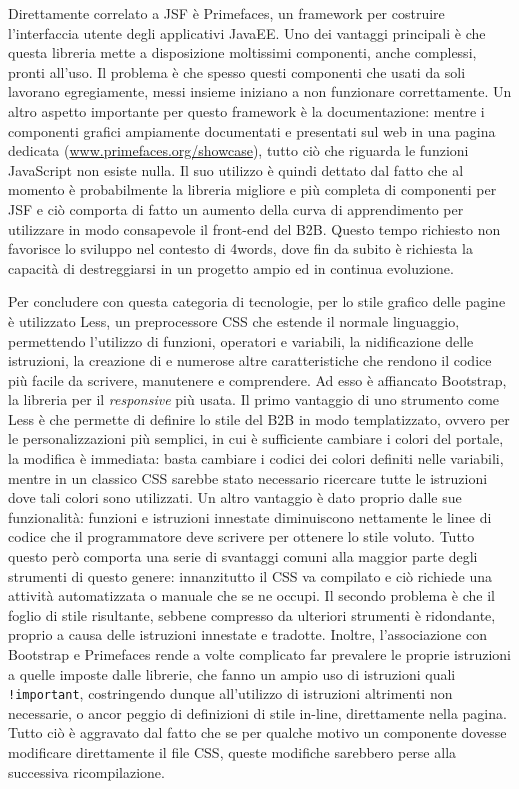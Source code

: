 Direttamente correlato a JSF è Primefaces, un framework per costruire l'interfaccia utente degli applicativi JavaEE. Uno dei vantaggi principali è che questa libreria mette a disposizione moltissimi componenti, anche complessi, pronti all'uso. Il problema è che spesso questi componenti che usati da soli lavorano egregiamente, messi insieme iniziano a non funzionare correttamente. Un altro aspetto importante per questo framework è la documentazione: mentre i componenti grafici ampiamente documentati e presentati sul web in una pagina dedicata (\url{www.primefaces.org/showcase}), tutto ciò che riguarda le funzioni JavaScript non esiste nulla. Il suo utilizzo è quindi dettato dal fatto che al momento è probabilmente la libreria migliore e più completa di componenti per JSF e ciò comporta di fatto un aumento della curva di apprendimento per utilizzare in modo consapevole il front-end del B2B. Questo tempo richiesto non favorisce lo sviluppo nel contesto di 4words, dove fin da subito è richiesta la capacità di destreggiarsi in un progetto ampio ed in continua evoluzione.

Per concludere con questa categoria di tecnologie, per lo stile grafico delle pagine è utilizzato Less, un preprocessore CSS che estende il normale linguaggio, permettendo l'utilizzo di funzioni, operatori e variabili, la nidificazione delle istruzioni, la creazione di  e numerose altre caratteristiche che rendono il codice più facile da scrivere, manutenere e comprendere.\autocite{wikipedia} Ad esso è affiancato Bootstrap, la libreria per il \textit{responsive} più usata. Il primo vantaggio di uno strumento come Less è che permette di definire lo stile del B2B in modo templatizzato, ovvero per le personalizzazioni più semplici, in cui è sufficiente cambiare i colori del portale, la modifica è immediata: basta cambiare i codici dei colori definiti nelle variabili, mentre in un classico CSS sarebbe stato necessario ricercare tutte le istruzioni dove tali colori sono utilizzati. Un altro vantaggio è dato proprio dalle sue funzionalità: funzioni e istruzioni innestate diminuiscono nettamente le linee di codice che il programmatore deve scrivere per ottenere lo stile voluto. Tutto questo però comporta una serie di svantaggi comuni alla maggior parte degli strumenti di questo genere: innanzitutto il CSS va compilato e ciò richiede una attività automatizzata o manuale che se ne occupi. Il secondo problema è che il foglio di stile risultante, sebbene compresso da ulteriori strumenti è ridondante, proprio a causa delle istruzioni innestate e tradotte. Inoltre, l'associazione con Bootstrap e Primefaces rende a volte complicato far prevalere le proprie istruzioni a quelle imposte dalle librerie, che fanno un ampio uso di istruzioni quali \texttt{!important}, costringendo dunque all'utilizzo di istruzioni altrimenti non necessarie, o ancor peggio di definizioni di stile in-line, direttamente nella pagina. Tutto ciò è aggravato dal fatto che se per qualche motivo un componente dovesse modificare direttamente il file CSS, queste modifiche sarebbero perse alla successiva ricompilazione.

